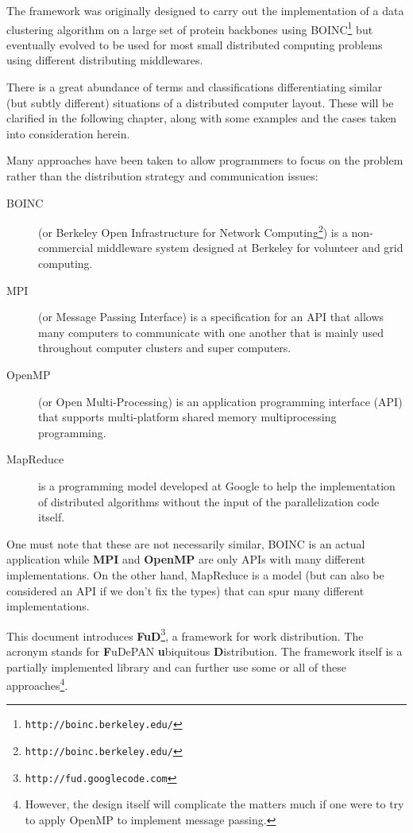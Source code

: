 \documentclass[a4paper,12pt,english]{report}
\newcommand{\fud}{\textbf{FuD}}
\begin{document}

The framework was originally designed to carry out the implementation of a data clustering\cite{clustering} algorithm on a large set of protein backbones using BOINC\footnote{\texttt{http://boinc.berkeley.edu/}} but eventually evolved to be used for most small distributed computing problems using different distributing middlewares.


There is a great abundance of terms and classifications differentiating similar (but subtly different) situations of a distributed computer layout. These will be clarified in the following chapter, along with some examples and the cases taken into consideration herein.

Many approaches have been taken to allow programmers to focus on the problem rather than the distribution strategy and communication issues:
\begin{description}
 \item [BOINC] (or Berkeley Open Infrastructure for Network Computing\footnote{\texttt{http://boinc.berkeley.edu/}}) is a non-commercial middleware system designed at Berkeley for volunteer and grid computing\cite{boinc1}.
 \item [MPI] (or Message Passing Interface) is a specification for an API that allows many computers to communicate with one another\cite{mpi} that is mainly used throughout computer clusters and super computers.
 \item [OpenMP] (or Open Multi-Processing) is an application programming interface (API) that supports multi-platform shared memory multiprocessing programming\cite{openmp}.
 \item [MapReduce] is a programming model developed at Google to help the implementation of distributed algorithms without the input of the parallelization code itself\cite{mapreduce}.
\end{description}

One must note that these are not necessarily similar, BOINC is an actual application while \textbf{MPI} and \textbf{OpenMP} are only APIs with many different implementations. On the other hand, MapReduce is a model (but can also be considered an API if we don't fix the types) that can spur many different implementations.

This document introduces \fud\footnote{\texttt{http://fud.googlecode.com}}, a framework for work distribution. The acronym stands for \textbf{F}uDePAN \textbf{u}biquitous \textbf{D}istribution. The framework itself is a partially implemented library and can further use some or all of these approaches\footnote{However, the design itself will complicate the matters much if one were to try to apply OpenMP to implement message passing.}. 
\end{document}
